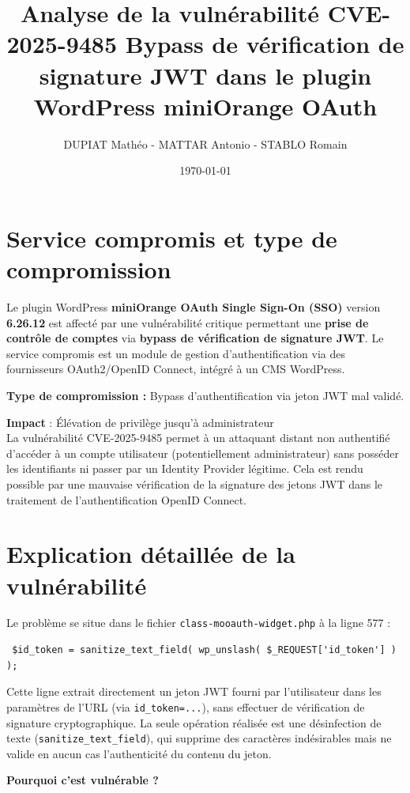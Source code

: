 \documentclass[a4paper,12pt]{article}
\title{Analyse de la vulnérabilité CVE-2025-9485\linebreak \smallskip
Bypass de vérification de signature JWT dans le plugin WordPress miniOrange OAuth}
\author{DUPIAT Mathéo - MATTAR Antonio - STABLO Romain}
\date{\today}
\begin{document}
\maketitle

\section{Service compromis et type de compromission}
Le plugin WordPress \textbf{miniOrange OAuth Single Sign-On (SSO)} version \textbf{6.26.12} est affecté par une vulnérabilité critique permettant une \textbf{prise de contrôle de comptes} via \textbf{bypass de vérification de signature JWT}. Le service compromis est un module de gestion d’authentification via des fournisseurs OAuth2/OpenID Connect, intégré à un CMS WordPress.

\textbf{Type de compromission :} Bypass d'authentification via jeton JWT mal validé.

\textbf{Impact} : Élévation de privilège jusqu'à administrateur
\newline \\
La vulnérabilité CVE-2025-9485 permet à un attaquant distant non authentifié d'accéder à un compte utilisateur (potentiellement administrateur) sans posséder les identifiants ni passer par un Identity Provider légitime. Cela est rendu possible par une mauvaise vérification de la signature des jetons JWT dans le traitement de l'authentification OpenID Connect.

\section{Explication détaillée de la vulnérabilité}
Le problème se situe dans le fichier \texttt{class-mooauth-widget.php} à la ligne 577 :

\begin{verbatim} $id_token = sanitize_text_field( wp_unslash( $_REQUEST['id_token'] ) ); \end{verbatim}

Cette ligne extrait directement un jeton JWT fourni par l’utilisateur dans les paramètres de l’URL (via \texttt{id\_token=...}), sans effectuer de vérification de signature cryptographique. La seule opération réalisée est une désinfection de texte (\texttt{sanitize\_text\_field}), qui supprime des caractères indésirables mais ne valide en aucun cas l’authenticité du contenu du jeton.

\textbf{Pourquoi c’est vulnérable ?}
\end{document}
